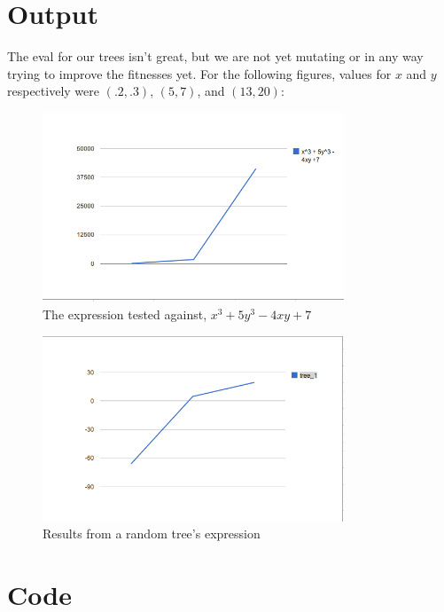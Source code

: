 \documentclass[12pt]{article}
\begin{document}
\section{Output}
\label{sec:output}
The eval for our trees isn't great, but we are not yet mutating or in any way trying to improve the fitnesses yet. For the following figures, values for $x$ and $y$ respectively were $(.2,.3)$, $(5,7)$, and $(13,20)$:

\begin{figure}[!h]
        \begin{center}
		\scriptsize
		\includegraphics[width=90mm]{images/equa.png}
               \caption{The expression tested against, $ x^3 + 5y^3 - 4xy + 7 $}
                \label{equa}
        \end{center}
\end{figure}

\begin{figure}[!h]
        \begin{center}
		\scriptsize
		\includegraphics[width=90mm]{images/tree.png}
               \caption{Results from a random tree's expression}
                \label{tree}
        \end{center}
\end{figure}

\pagebreak


\section{Code}
\footnotesize
\end{document}

